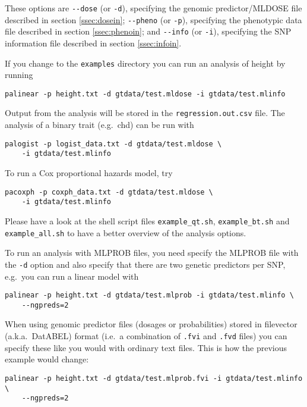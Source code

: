 \documentclass[12pt,a4paper]{article}
\begin{document}
These options are \lstinline{--dose} (or \lstinline{-d}), specifying the
genomic predictor/MLDOSE file described in section \ref{ssec:dosein};
\lstinline{--pheno} (or \lstinline{-p}), specifying the phenotypic data file
described in section \ref{ssec:phenoin}; and \lstinline{--info} (or
\lstinline{-i}), specifying the SNP information file described in section
\ref{ssec:infoin}.

If you change to the \texttt{examples} directory you can run
an analysis of height by running
\begin{verbatim}
palinear -p height.txt -d gtdata/test.mldose -i gtdata/test.mlinfo
\end{verbatim}
Output from the analysis will be stored in the
\texttt{regression.out.csv} file.
The analysis of a binary trait (e.g.~chd) can be run with
\begin{verbatim}
palogist -p logist_data.txt -d gtdata/test.mldose \
    -i gtdata/test.mlinfo
\end{verbatim}
To run a Cox proportional hazards model, try
\begin{verbatim}
pacoxph -p coxph_data.txt -d gtdata/test.mldose \
    -i gtdata/test.mlinfo
\end{verbatim}

Please have a look at the shell script files \texttt{example\_qt.sh},
\texttt{example\_bt.sh} and \texttt{example\_all.sh} to have
a better overview of the analysis options.

To run an analysis with MLPROB files, you need specify the MLPROB file
with the \lstinline{-d} option and also specify that there are two
genetic predictors per SNP, e.g.~you can run a linear model with
\begin{verbatim}
palinear -p height.txt -d gtdata/test.mlprob -i gtdata/test.mlinfo \
    --ngpreds=2
\end{verbatim}

When using genomic predictor files (dosages or probabilities) stored
in filevector (a.k.a.~DatABEL) format (i.e.~a combination of
\texttt{.fvi} and \texttt{.fvd} files) you can specify these like you
would with ordinary text files. This is how the previous example would
change:
\begin{verbatim}
palinear -p height.txt -d gtdata/test.mlprob.fvi -i gtdata/test.mlinfo \
    --ngpreds=2
\end{verbatim}
\end{document}
